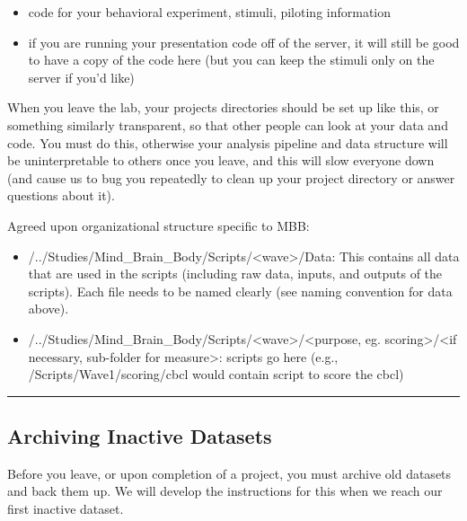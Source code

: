 \documentclass[]{book}
\providecommand{\tightlist}{%
  \setlength{\itemsep}{0pt}\setlength{\parskip}{0pt}}
\begin{document}
\begin{itemize}
  \begin{itemize}
  \tightlist
  \item
    code for your behavioral experiment, stimuli, piloting information
  \item
    if you are running your presentation code off of the server, it will still be good to have a copy of the code here (but you can keep the stimuli only on the server if you'd like)
  \end{itemize}
\end{itemize}

When you leave the lab, your projects directories should be set up like this, or something similarly transparent, so that other people can look at your data and code. You must do this, otherwise your analysis pipeline and data structure will be uninterpretable to others once you leave, and this will slow everyone down (and cause us to bug you repeatedly to clean up your project directory or answer questions about it).

Agreed upon organizational structure specific to MBB:

\begin{itemize}
\tightlist
\item
  /../Studies/Mind\_Brain\_Body/Scripts/\textless{}wave\textgreater{}/Data: This contains all data that are used in the scripts (including raw data, inputs, and outputs of the scripts). Each file needs to be named clearly (see naming convention for data above).
\item
  /../Studies/Mind\_Brain\_Body/Scripts/\textless{}wave\textgreater{}/\textless{}purpose, eg. scoring\textgreater{}/\textless{}if necessary, sub-folder for measure\textgreater{}: scripts go here (e.g., /Scripts/Wave1/scoring/cbcl would contain script to score the cbcl)
\end{itemize}

\begin{center}\rule{0.5\linewidth}{0.5pt}\end{center}

\hypertarget{archiving-inactive-datasets}{%
\subsection{Archiving Inactive Datasets}\label{archiving-inactive-datasets}}

Before you leave, or upon completion of a project, you must archive old datasets and back them up. We will develop the instructions for this when we reach our first inactive dataset.
\end{document}
